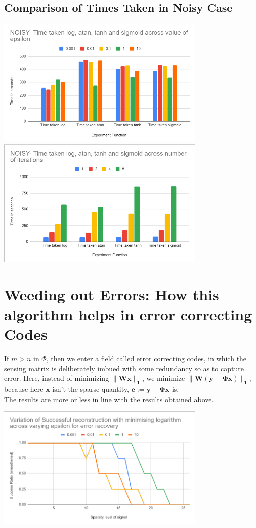 \documentclass[a4paper,14pt]{article}
\numberwithin{definition}{section}
\numberwithin{mytheorem}{subsection}
\begin{document}
\subsection{Comparison of Times Taken in Noisy Case}

\begin{center}
    \includegraphics[width=10cm]{time_epsilon_noisy.png}
    \includegraphics[width=10cm]{time_iterations_noisy.png}
\end{center}

\section{Weeding out Errors: How this algorithm helps in error correcting Codes}
If $m > n$ in $\Phi$, then we enter a field called error correcting codes, in which the sensing matrix is deliberately imbued with some redundancy so as to capture error. Here, instead of minimizing $\boldsymbol{\lVert Wx\rVert_1}$, we minimize $\boldsymbol{\lVert W(y - \Phi x)\rVert_1}$, because here $\boldsymbol{x}$ isn't the sparse quantity, $\boldsymbol{e := y -\Phi x}$ is.\\
The results are more or less in line with the results obtained above.

\begin{center}
    \includegraphics[width=10cm]{Error_Recovery.png}
\end{center}
\end{document}
